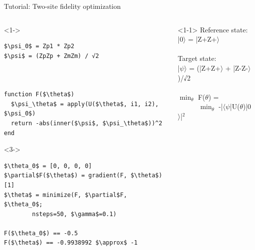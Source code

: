 \begin{frame}[fragile]{Tutorial: Two-site fidelity optimization}

\begin{columns}

\begin{column}{5cm}

\begin{onlyenv}<1->
\begin{lstlisting}[language=JuliaLocal, style=julia, mathescape, basicstyle=\scriptsize\ttfamily]
$\psi_0$ = Zp1 * Zp2
$\psi$ = (ZpZp + ZmZm) / √2



function F($\theta$)
  $\psi_\theta$ = apply(U($\theta$, i1, i2), $\psi_0$)
  return -abs(inner($\psi$, $\psi_\theta$))^2
end
\end{lstlisting}
\end{onlyenv}

\begin{onlyenv}<3->
\begin{lstlisting}[language=JuliaLocal, style=julia, mathescape, basicstyle=\scriptsize\ttfamily]
$\theta_0$ = [0, 0, 0, 0]
$\partial$F($\theta$) = gradient(F, $\theta$)[1]
$\theta$ = minimize(F, $\partial$F, $\theta_0$;
        nsteps=50, $\gamma$=0.1)

F($\theta_0$) == -0.5
F($\theta$) == -0.9938992 $\approx$ -1
\end{lstlisting}
\end{onlyenv}

\end{column}

\begin{column}{5cm}

\begin{onlyenv}<1-1>
Reference state: \\
|0$\rangle$ = |Z+Z+$\rangle$ \\
~\\
Target state: \\
|$\psi\rangle$ = (|Z+Z+$\rangle$ + |Z-Z-$\rangle$)/√2 \\
~\\
$\min_{\theta}$ F($\theta$) = \\
\ \ \ \ \ \ $\min_{\theta}$ -|$\langle\psi$|U($\theta$)|0$\rangle$|$^2$
\end{onlyenv}


\end{column}
\end{columns}
\end{frame}
